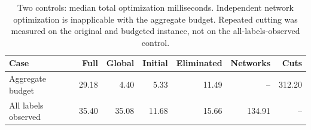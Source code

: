 \begin{table}[tb]\centering\small
\caption{Two controls: median total optimization milliseconds. Independent network optimization is inapplicable with the aggregate budget. Repeated cutting was measured on the original and budgeted instance, not on the all-labels-observed control.}
\label{tab:computation-ablations}
\setlength{\tabcolsep}{3pt}
\begin{tabular}{lrrrrrr}\toprule
Case & Full & Global & Initial & Eliminated & Networks & Cuts\\\midrule
Aggregate budget & 29.18 & 4.40 & 5.33 & 11.49 & -- & 312.20 \\
All labels observed & 35.40 & 35.08 & 11.68 & 15.66 & 134.91 & -- \\
\bottomrule\end{tabular}\end{table}
